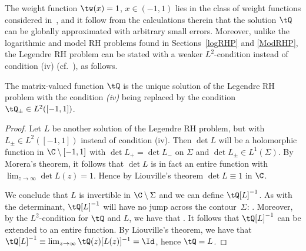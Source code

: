 The weight function $\tw(x) = 1$, $x\in(-1,1)$ lies in the class of weight functions considered in~\cite{KMVV}, and it follow from the calculations therein that the solution $\tQ$ can be globally approximated with arbitrary small errors. Moreover, unlike the logarithmic and model RH problems found in Sections~\ref{logRHP} and \ref{ModRHP}, the Legendre RH problem can be stated with a weaker $L^2$-condition instead of condition (iv) (cf.\ \cite[Proposition~3.2]{CD}), as follows.

\begin{Proposition}\label{LegUniq}
 The matrix-valued function $\tQ$ is the unique solution of the Legendre RH problem with the condition \emph{(iv)} being replaced by the condition $\tQ_\pm \in L^2([-1,1])$.
\end{Proposition}
\begin{proof}
Let $L$ be another solution of the Legendre RH problem, but with $L_\pm\in L^2([-1,1])$ instead of condition (iv). Then $\det L$ will be a holomorphic function in $\C \setminus [-1,1]$ with
$\det L_+ = \det L_-$ on $\Sigma$ and $\det L_\pm \in L^1(\Sigma)$. By Morera's theorem, it follows that $\det L$ is in fact an entire function with $\lim_{z\to\infty} \det L(z) = 1$. Hence by Liouville's theorem $\det L \equiv 1$ in $\C$.

We conclude that $L$ is invertible in $\C \setminus \Sigma$ and we can define $\tQ[L]^{-1}$. As with the determinant, $\tQ[L]^{-1}$ will have no jump across the contour~$\Sigma$: . Moreover, by the $L^2$-condition for $\tQ$ and $L$, we have that . It follows that $\tQ[L]^{-1}$ can be extended to an entire function. By Liouville's theorem, we have that $\tQ[L]^{-1} \equiv \lim_{z\to\infty} \tQ(z)[L(z)]^{-1} = \Id$, hence $\tQ = L$.
\end{proof}

